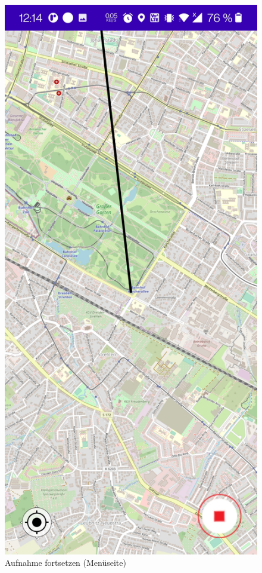 \documentclass{article}
\begin{document}
\begin{figure}[H]
		  \centering
		  \caption{Aufnahme fortsetzen (Menüseite)}
		\endminipage\hfill
		  \includegraphics[width=\linewidth]{9_fortsetzen2.jpg}

\end{figure}
\end{document}
